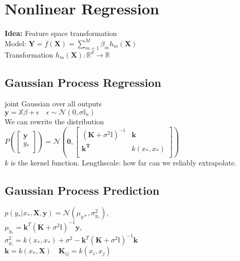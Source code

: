 \section*{Nonlinear Regression}
\textbf{Idea:} Feature space transformation\\
Model: $\mathbf{Y}=f(\mathbf{X})=\sum_{m=1}^M\beta_m h_m(\mathbf{X})$\\
Transformation $h_m(\mathbf{X}):\mathbb{R}^d \rightarrow \mathbb{R}$




\subsection*{Gaussian Process Regression}
joint Gaussian over all outputs\\
$\mathbf{y}=\mathbb{X}\beta+\epsilon \quad \epsilon\sim \mathcal{N}(0,\sigma\mathbb{I}_n)$\\
We can rewrite the distribution\\
$P(\begin{bmatrix}
\mathbf{y}\\
y_*\\
\end{bmatrix}){=}\mathcal{N}(\mathbf{0},\begin{bmatrix}
(\mathbf{K}+\sigma^2\mathbb{I})^{-1} & \mathbf{k} \\
\mathbf{k^T} & k(x_*,x_*) \\
\end{bmatrix})$\\

$k$ is the kernel function. Lengthscale: how far can we reliably extrapolate.
\subsection*{Gaussian Process Prediction}
$p(y_*|x_*,\mathbf{X},\mathbf{y}) = \mathcal{N}(\mu_{y*},\sigma^2_{y_*})$,\\
$\mu_{y_*}=\mathbf{k}^T(\mathbf{K}+\sigma^2\mathbb{I})^{-1}\mathbf{y}$,\\
$\sigma^2_{y_*}=k(x_*,x_*){+}\sigma^2-\mathbf{k}^T(\mathbf{K}+\sigma^2\mathbb{I})^{-1}\mathbf{k}$\\
$\mathbf{k}=k(x_*,\mathbf{X})\quad \mathbf{K}_{ij}=k(x_i,x_j)$\\

